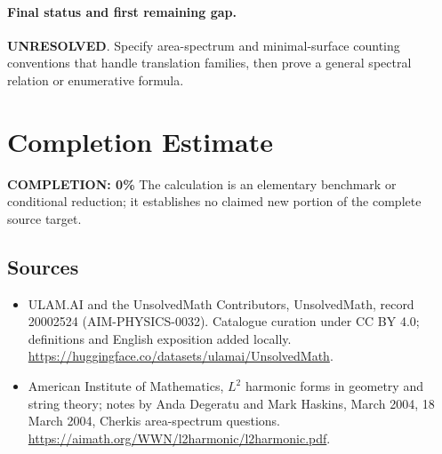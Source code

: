\documentclass[11pt]{article}
\begin{document}
\paragraph{Final status and first remaining gap.}
\textbf{UNRESOLVED}. Specify area-spectrum and minimal-surface counting conventions that handle translation families, then prove a general spectral relation or enumerative formula.

\section{Completion Estimate}
\noindent\textbf{COMPLETION: 0\%}
The calculation is an elementary benchmark or conditional reduction; it establishes no claimed new portion of the complete source target.

\subsection{Sources}
\begin{itemize}
\item[\hypertarget{source:20002524:1}{S1}] ULAM.AI and the UnsolvedMath Contributors, UnsolvedMath, record 20002524 (AIM-PHYSICS-0032). Catalogue curation under CC BY 4.0; definitions and English exposition added locally.
\url{https://huggingface.co/datasets/ulamai/UnsolvedMath}.
\item[\hypertarget{source:20002524:2}{S2}] American Institute of Mathematics, $L^2$ harmonic forms in geometry and string theory; notes by Anda Degeratu and Mark Haskins, March 2004, 18 March 2004, Cherkis area-spectrum questions.
\url{https://aimath.org/WWN/l2harmonic/l2harmonic.pdf}.
\end{itemize}
\label{end:20002524}
\end{document}
